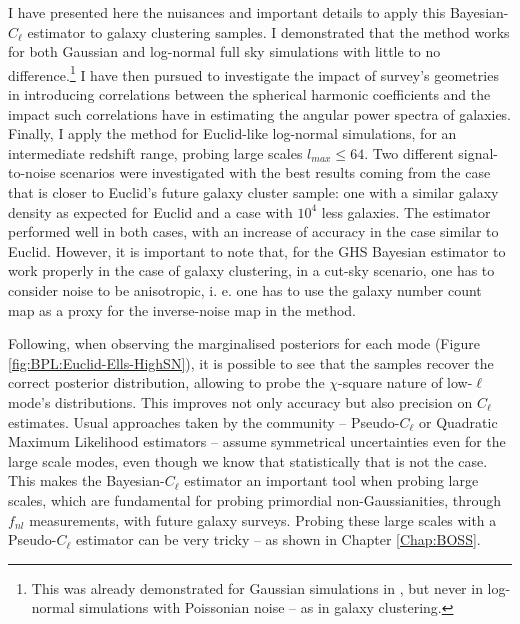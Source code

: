 \qquad I have presented here the nuisances and important details to apply this Bayesian-$C_{\ell}$ estimator to galaxy clustering samples. I demonstrated that the method works for both Gaussian and log-normal full sky simulations with little to no difference.\footnote{This was already demonstrated for Gaussian simulations in \cite{SreeThesis}, but never in log-normal simulations with Poissonian noise -- as in galaxy clustering.} I have then pursued to investigate the impact of survey's geometries in introducing correlations between the spherical harmonic coefficients and the impact such correlations have in estimating the angular power spectra of galaxies. Finally, I apply the method for Euclid-like log-normal simulations, for an intermediate redshift range, probing large scales $l_{max} \leq 64$. Two different signal-to-noise scenarios were investigated with the best results coming from the case that is closer to Euclid's future galaxy cluster sample: one with a similar galaxy density as expected for Euclid and a case with $10^{4}$ less galaxies. The estimator performed well in both cases, with an increase of accuracy in the case similar to Euclid. However, it is important to note that, for the GHS Bayesian estimator to work properly in the case of galaxy clustering, in a cut-sky scenario, one has to consider noise to be anisotropic, i. e. one has to use the galaxy number count map as a proxy for the inverse-noise map in the method.

\qquad Following, when observing the marginalised posteriors for each mode (Figure \ref{fig:BPL:Euclid-Ells-HighSN}), it is possible to see that the samples recover the correct posterior distribution, allowing to probe the $\chi$-square nature of low-$\ell$ mode's distributions. This improves not only accuracy but also precision on $C_{\ell}$ estimates. Usual approaches taken by the community -- Pseudo-$C_{\ell}$ \citep{Peebles1973,Efstat2004,Blake2007,Thomas2011,2018LoureiroBOSS} or Quadratic Maximum Likelihood estimators \citep{1994Gorsky,1997Tegmark,Hobson2002,Efstat2004,Boris2013} -- assume symmetrical uncertainties even for the large scale modes, even though we know that statistically that is not the case. This makes the Bayesian-$C_{\ell}$ estimator an important tool when probing large scales, which are fundamental for probing primordial non-Gaussianities, through $f_{nl}$ measurements, with future galaxy surveys. Probing these large scales with a Pseudo-$C_{\ell}$ estimator can be very tricky -- as shown in Chapter \ref{Chap:BOSS}. 

